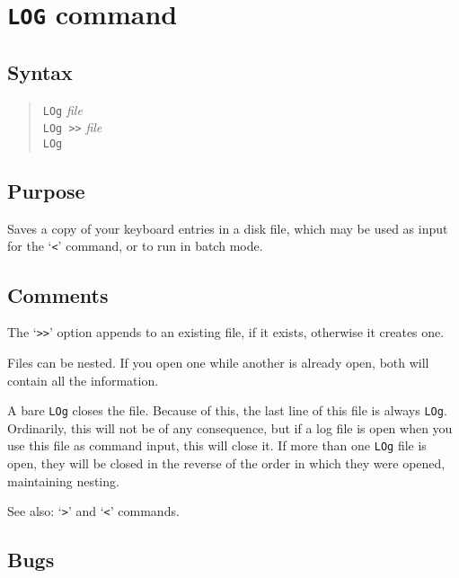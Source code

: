 \section{{\tt LOG} command}
\subsection{Syntax}
\begin{verse}
{\tt LOg} {\it file}\\
{\tt LOg >>} {\it file}\\
{\tt LOg}
\end{verse}
\subsection{Purpose}

Saves a copy of your keyboard entries in a disk file, which may be used as
input for the `{\tt <}' command, or to run in batch mode.
\subsection{Comments}

The `{\tt >>}' option appends to an existing file, if it exists, otherwise it
creates one.

Files can be nested.  If you open one while another is already open, both
will contain all the information.

A bare {\tt LOg} closes the file.  Because of this, the last line of this
file is always {\tt LOg}.  Ordinarily, this will not be of any consequence,
but if a log file is open when you use this file as command input, this will
close it.  If more than one {\tt LOg} file is open, they will be closed in
the reverse of the order in which they were opened, maintaining nesting.

See also: `{\tt >}' and `{\tt <}' commands.
\subsection{Bugs}

